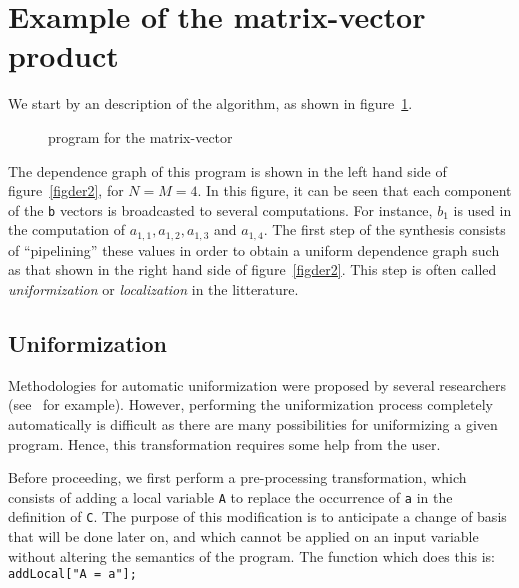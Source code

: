 \section{Example of the matrix-vector product}
We start by an \alfa{} description of the algorithm, 
as shown in figure~\ref{figder1}. 

\begin{figure}[htbp]

\caption{{\alfa} program for the matrix-vector}
\label{figder1}
\end{figure}

The dependence graph of this program 
is shown in the left hand side of figure~\ref{figder2}, 
for $N=M=4$. In this
figure, it can be seen that each component of the {\tt b} vectors is
broadcasted to several computations. For instance, $b_1$ is used in
the computation of $ a_{1,1}, a_{1,2}, a_{1,3}$ and $a_{1,4}$. The
first step of the synthesis consists of ``pipelining'' these values
in order to obtain a uniform dependence graph such as 
that shown in the right hand side of
figure~\ref{figder2}. This step is often called {\em uniformization}
or {\em localization}
in the litterature.

\subsection{Uniformization}

Methodologies for automatic uniformization were
proposed by several researchers
(see~\cite{QuintonVa88} for example). However, performing the
uniformization process completely automatically is difficult as there
are many possibilities for uniformizing a given program. Hence, 
this transformation requires some help from the user.

Before proceeding, we first perform a pre-processing 
transformation, which consists of adding a local 
variable \texttt{A} to replace the occurrence of
\texttt{a} in the definition of \texttt{C}. The purpose of
this modification is to anticipate a change of basis 
that will be done later on, and which cannot be applied on
an input variable without altering the semantics of
the program. The \mmalfa{} function which does this
is:\\
\texttt{addLocal["A = a"];}\\

